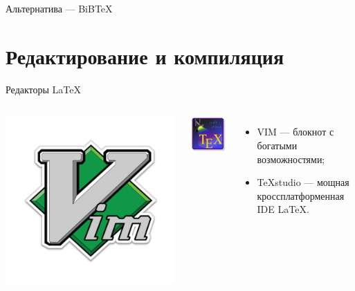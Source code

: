 
\begin{frame}{Альтернатива --- BiB\TeX}
    \webBib
\end{frame}

\section{Редактирование и компиляция}

\begin{frame}{Редакторы \LaTeX}
    \begin{columns}
        \centering
        \includegraphics[width=.4\linewidth]{../Figures/vim.png}

        \includegraphics[width=.4\linewidth]{../Figures/texstudio.png}
        \begin{itemize}
            \pause\item VIM --- блокнот с богатыми возможностями;
            \pause\item \TeX studio --- мощная кроссплатформенная IDE \LaTeX.
        \end{itemize}
    \end{columns}
\end{frame}

